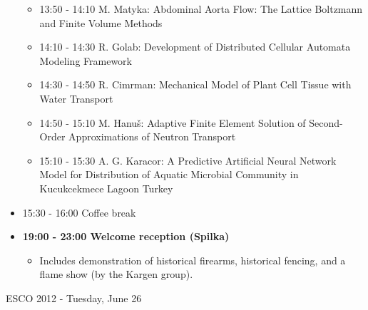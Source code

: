 \documentclass[10pt, A4]{article}%
\begin{document}
\begin{itemize}
\begin{itemize}
    \item 13:50 - 14:10 M. Matyka: Abdominal Aorta Flow: The Lattice Boltzmann and Finite Volume Methods
    \item 14:10 - 14:30 R. Golab: Development of Distributed Cellular Automata Modeling Framework
    \item 14:30 - 14:50 R. Cimrman: Mechanical Model of Plant Cell Tissue with Water Transport
    \item 14:50 - 15:10 M. Hanu\v{s}: Adaptive Finite Element Solution of Second-Order Approximations of Neutron Transport
    \item 15:10 - 15:30 A. G. Karacor: A Predictive Artificial Neural Network Model for Distribution of Aquatic Microbial Community in Kucukcekmece Lagoon Turkey
  \end{itemize}
  \item 15:30 - 16:00 Coffee break
  \item {\bf 19:00 - 23:00 Welcome reception (Spilka)} 
  \begin{itemize}
     \item Includes demonstration of historical firearms, historical fencing, and a flame show (by the Kargen group).  
  \end{itemize}
\end{itemize}

\newpage

\centerline{\huge ESCO 2012 - Tuesday, June 26}
\vspace{4mm}
\end{document}
